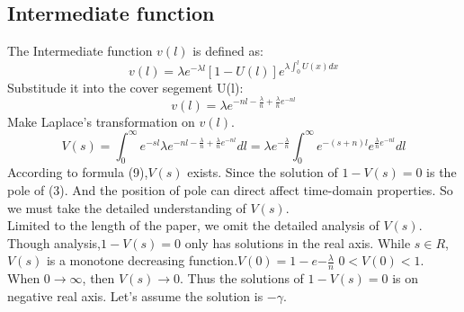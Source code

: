 \documentclass[10pt]{article}
\begin{document}
\subsection{Intermediate function}
The Intermediate function $v(l)$ is defined as:
\begin{equation}
    v(l)=\lambda e^{-\lambda l}[1-U(l)]e^{\lambda \int _{0}^{l}U(x)dx}
\end{equation}
Substitude it into the cover segement U(l):
\begin{equation}
    v(l)=\lambda e^{-nl-\frac{\lambda}{n}+\frac{\lambda}{n}e^{-nl}}
\end{equation}
Make Laplace's transformation on $v(l)$.
\begin{equation}
    V(s)=\int _{0}^{\infty}e^{-sl}\lambda e^{-nl-\frac{\lambda}{n}+\frac{\lambda}{n}e^{-nl}}dl=\lambda e^{-\frac{\lambda}{n}}\int _{0}^{\infty}e^{-(s+n)l}e^{\frac{\lambda}{n}e^{-nl}}dl
\end{equation}
According to formula (9),$V(s)$ exists. Since the solution of $1-V(s)=0$ is the pole of (3). And the position of pole can direct affect time-domain properties. So we must take the detailed understanding of $V(s)$. \\
Limited to the length of the paper, we omit the detailed analysis of $V(s)$. Though analysis,$1-V(s)=0$ only has solutions in the real axis. While $s\in R$,$V(s)$ is a monotone decreasing function.$V(0)=1-e{-\frac{\lambda}{n}}$ $0<V(0)<1$. When $0\to \infty$, then $V(s)\to 0$. Thus the solutions of $1-V(s)=0$ is on negative real axis. Let's assume the solution is $-\gamma$.
\end{document}
